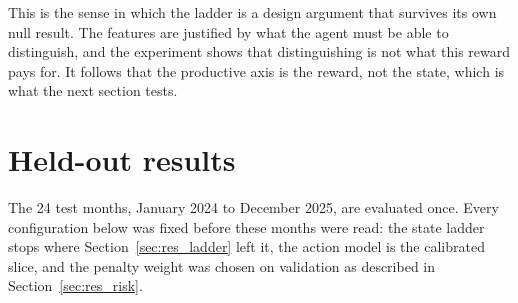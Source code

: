 This is the sense in which the ladder is a design argument that survives its
own null result. The features are justified by what the agent must be able
to distinguish, and the experiment shows that distinguishing is not what
this reward pays for. It follows that the productive axis is the reward, not
the state, which is what the next section tests.

\section{Held-out results}
\label{sec:res_final}

The 24 test months, January 2024 to December 2025, are evaluated once. Every
configuration below was fixed before these months were read: the state ladder
stops where Section~\ref{sec:res_ladder} left it, the action model is the
calibrated slice, and the penalty weight was chosen on validation as described
in Section~\ref{sec:res_risk}.


